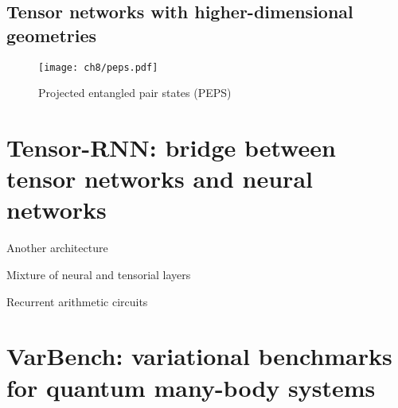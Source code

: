 \section{Tensor networks with higher-dimensional geometries}

\begin{figure}[htb]
\centering
\texttt{[image: ch8/peps.pdf]}
\caption[Projected entangled pair states (PEPS)]{
Projected entangled pair states (PEPS)
}
\label{fig:peps}
\end{figure}

\chapter{Tensor-RNN: bridge between tensor networks and neural networks}

Another architecture~\cite{hibat2021variational, hibat2022supplementing}

Mixture of neural and tensorial layers~\cite{chen2023antn}

Recurrent arithmetic circuits~\cite{levine2017long, levine2019quantum}

\chapter{VarBench: variational benchmarks for quantum many-body systems}
\label{ch:varbench}
